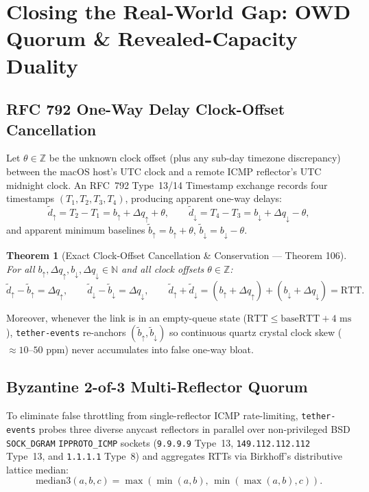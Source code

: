 \documentclass[11pt,a4paper]{article}
\newtheorem{theorem}{Theorem}[section]
\theoremstyle{definition}
\begin{document}
\section{Closing the Real-World Gap: OWD Quorum \& Revealed-Capacity Duality}
\label{sec:sota}

\subsection{RFC 792 One-Way Delay Clock-Offset Cancellation}

Let $\theta \in \mathbb{Z}$ be the unknown clock offset (plus any sub-day timezone discrepancy) between the macOS host's UTC clock and a remote ICMP reflector's UTC midnight clock. An RFC~792 Type~13/14 Timestamp exchange records four timestamps $(T_1, T_2, T_3, T_4)$, producing apparent one-way delays:
\[
  \tilde{d}_\uparrow = T_2 - T_1 = b_\uparrow + \Delta q_\uparrow + \theta, \qquad
  \tilde{d}_\downarrow = T_4 - T_3 = b_\downarrow + \Delta q_\downarrow - \theta,
\]
and apparent minimum baselines $\tilde{b}_\uparrow = b_\uparrow + \theta$, $\tilde{b}_\downarrow = b_\downarrow - \theta$.

\begin{theorem}[Exact Clock-Offset Cancellation \& Conservation --- Theorem 106]
For all $b_\uparrow, \Delta q_\uparrow, b_\downarrow, \Delta q_\downarrow \in \mathbb{N}$ and all clock offsets $\theta \in \mathbb{Z}$:
\[
  \tilde{d}_\uparrow - \tilde{b}_\uparrow = \Delta q_\uparrow, \qquad
  \tilde{d}_\downarrow - \tilde{b}_\downarrow = \Delta q_\downarrow, \qquad
  \tilde{d}_\uparrow + \tilde{d}_\downarrow = (b_\uparrow + \Delta q_\uparrow) + (b_\downarrow + \Delta q_\downarrow) = \mathrm{RTT}.
\]
\end{theorem}
Moreover, whenever the link is in an empty-queue state ($\mathrm{RTT} \le \mathrm{baseRTT} + 4\text{ ms}$), \texttt{tether-events} re-anchors $(\tilde{b}_\uparrow, \tilde{b}_\downarrow)$ so continuous quartz crystal clock skew ($\approx 10\text{--}50\text{ ppm}$) never accumulates into false one-way bloat.

\subsection{Byzantine 2-of-3 Multi-Reflector Quorum}

To eliminate false throttling from single-reflector ICMP rate-limiting, \texttt{tether-events} probes three diverse anycast reflectors in parallel over non-privileged BSD \texttt{SOCK\_DGRAM} \texttt{IPPROTO\_ICMP} sockets (\texttt{9.9.9.9} Type~13, \texttt{149.112.112.112} Type~13, and \texttt{1.1.1.1} Type~8) and aggregates RTTs via Birkhoff's distributive lattice median:
\[
  \mathrm{median3}(a, b, c) = \max(\min(a, b),\, \min(\max(a, b), c)).
\]
\end{document}
